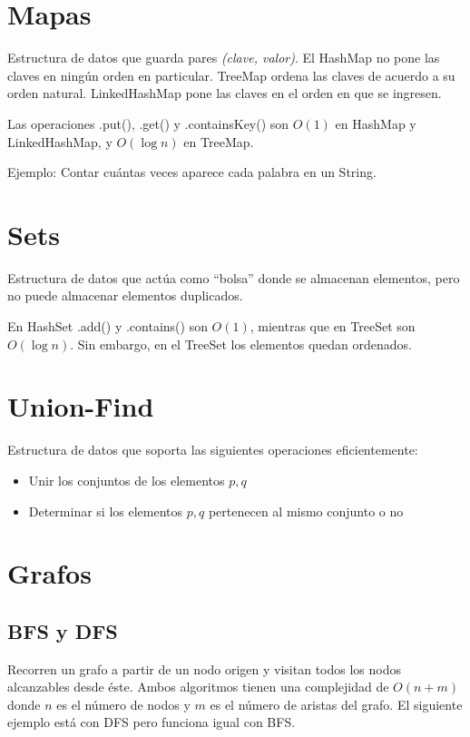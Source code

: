 \documentclass{article}
\begin{document}
\begin{multicols}{2}

\tableofcontents

\section{Mapas}
Estructura de datos que guarda pares \emph{(clave, valor)}. El HashMap no pone las claves en ningún orden en particular. TreeMap ordena las claves de acuerdo a su orden natural. LinkedHashMap pone las claves en el orden en que se ingresen.

Las operaciones .put(), .get() y .containsKey() son \( O(1) \) en HashMap y LinkedHashMap, y \( O(\log n) \) en TreeMap.

Ejemplo: Contar cuántas veces aparece cada palabra en un String.


\section{Sets}
Estructura de datos que actúa como ``bolsa'' donde se almacenan elementos, pero no puede almacenar elementos duplicados.

En HashSet .add() y .contains() son \( O(1) \), mientras que en TreeSet son \( O(\log n) \). Sin embargo, en el TreeSet los elementos quedan ordenados.


\section{Union-Find}
Estructura de datos que soporta las siguientes operaciones eficientemente:
\begin{itemize}
	\item Unir los conjuntos de los elementos \( p, q \)
	\item Determinar si los elementos \( p, q \) pertenecen al mismo conjunto o no
\end{itemize}


\section{Grafos}
	\subsection{BFS y DFS}
	Recorren un grafo a partir de un nodo origen y visitan todos los nodos alcanzables desde éste. Ambos algoritmos tienen una complejidad de \( O(n + m) \) donde \( n \) es el número de nodos y \( m \) es el número de aristas del grafo. El siguiente ejemplo está con DFS pero funciona igual con BFS.	
	


\end{multicols}
\end{document}
